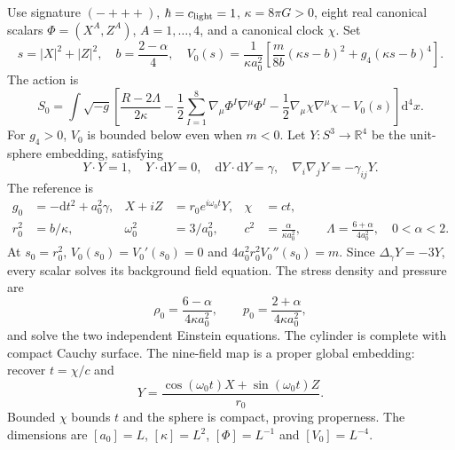 \documentclass[11pt]{article}
\newcommand{\dd}{\mathrm d}
\numberwithin{equation}{section}
\begin{document}
Use signature $(-+++)$, $\hbar=c_{\rm light}=1$, $\kappa=8\pi G>0$, eight real canonical scalars $\Phi=(X^A,Z^A)$, $A=1,\ldots,4$, and a canonical clock $\chi$.
Set
\begin{equation}
 s=|X|^2+|Z|^2,\quad b=\frac{2-\alpha}{4},\quad
 V_0(s)=\frac1{\kappa a_0^2}\left[\frac{m}{8b}(\kappa s-b)^2+g_4(\kappa s-b)^4\right].
 \label{eq:potential}
\end{equation}
The action is
\begin{equation}
 S_0=\int\sqrt{-g}\left[\frac{R-2\Lambda}{2\kappa}
 -\frac12\sum_{I=1}^{8}\nabla_\mu\Phi^I\nabla^\mu\Phi^I
 -\frac12\nabla_\mu\chi\nabla^\mu\chi-V_0(s)\right]\dd^4x.
 \label{eq:canonical}
\end{equation}
For $g_4>0$, $V_0$ is bounded below even when $m<0$.
Let $Y:S^3\to\mathbb R^4$ be the unit-sphere embedding, satisfying
\begin{equation}
 Y\cdot Y=1,\quad Y\cdot\dd Y=0,\quad \dd Y\cdot\dd Y=\gamma,
 \quad\nabla_i\nabla_jY=-\gamma_{ij}Y.
\end{equation}
The reference is
\begin{align}
 g_0&=-\dd t^2+a_0^2\gamma,& X+iZ&=r_0e^{i\omega_0t}Y,&\chi&=ct,\label{eq:bg}\\
 r_0^2&=b/\kappa,&\omega_0^2&=3/a_0^2,&
 c^2&=\frac\alpha{\kappa a_0^2},\qquad
 \Lambda=\frac{6+\alpha}{4a_0^2},\quad0<\alpha<2.
\end{align}
At $s_0=r_0^2$, $V_0(s_0)=V_0'(s_0)=0$ and $4a_0^2r_0^2V_0''(s_0)=m$.
Since $\Delta_\gamma Y=-3Y$, every scalar solves its background field equation.
The stress density and pressure are
\begin{equation}
 \rho_0=\frac{6-\alpha}{4\kappa a_0^2},\qquad
 p_0=\frac{2+\alpha}{4\kappa a_0^2},
\end{equation}
and solve the two independent Einstein equations.
The cylinder is complete with compact Cauchy surface.
The nine-field map is a proper global embedding: recover $t=\chi/c$ and
\begin{equation}
 Y=\frac{\cos(\omega_0t)X+\sin(\omega_0t)Z}{r_0}.
\end{equation}
Bounded $\chi$ bounds $t$ and the sphere is compact, proving properness.
The dimensions are $[a_0]=L$, $[\kappa]=L^2$, $[\Phi]=L^{-1}$ and $[V_0]=L^{-4}$.
\end{document}
